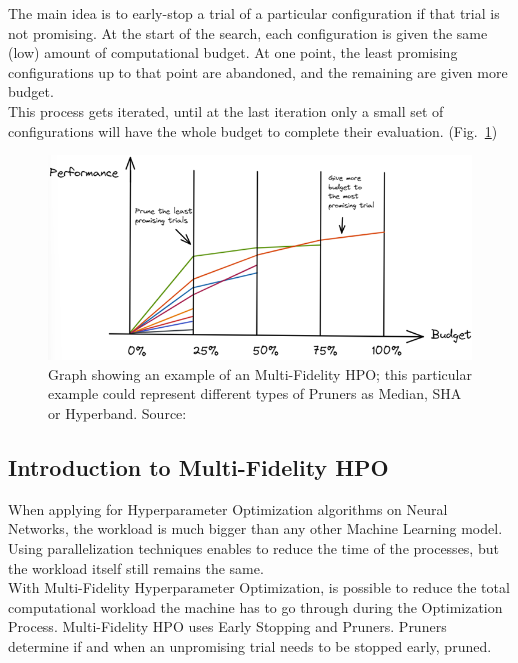 The main idea is to early-stop a trial of a particular configuration if that trial is not promising.
At the start of the search, each configuration is given the same (low) amount of computational budget. At one point, the least promising configurations up to that point are abandoned, and the remaining are given more budget.
\\[0.3cm]This process gets iterated, until at the last iteration only a small set of configurations will have the whole budget to complete their evaluation. (Fig.~\ref{fig:figure-2.3.1})
\begin{figure}[t]
	\centering
	\includegraphics[width=14cm]{figures/figure-2.3.1.png}
	\caption[Multi-Fidelity HPO Process Example]{Graph showing an example of an Multi-Fidelity HPO; this particular example could represent different types of Pruners as Median, SHA or Hyperband. Source:~\cite{Tesi-1.3}}
	\label{fig:figure-2.3.1}
\end{figure}

\subsection{Introduction to Multi-Fidelity HPO}

When applying for Hyperparameter Optimization algorithms on Neural Networks, the workload is much bigger than any other Machine Learning model.
Using parallelization techniques enables to reduce the time of the processes, but the workload itself still remains the same.
\\[0.3cm]With Multi-Fidelity Hyperparameter Optimization, is possible to reduce the total computational workload the machine has to go through during the Optimization Process.
Multi-Fidelity HPO uses Early Stopping and Pruners. Pruners determine if and when an unpromising trial needs to be stopped early, pruned.

